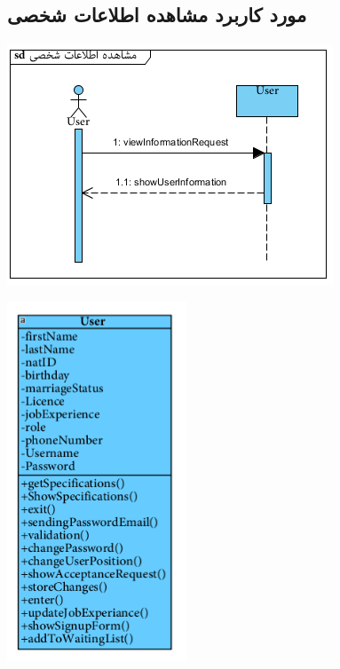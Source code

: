 \newpage
\vspace{2cm}
\subsection*{مورد کاربرد مشاهده اطلاعات شخصی}
\vspace{2cm}
\begin{center}
\includegraphics[width=\textwidth]{SequenceDiagrams/15.png}
\end{center}

\newpage
\vspace{2cm}
\begin{center}
\includegraphics[width=0.4\textwidth]{SequenceClasses/15.png}
\end{center}

